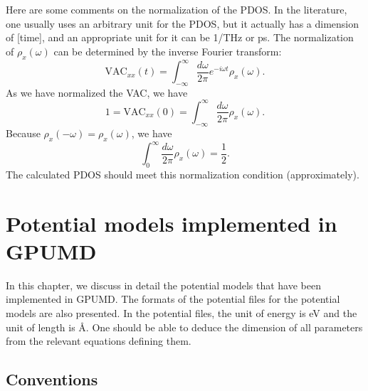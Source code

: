 \documentclass[12pt,a4paper]{report}
\begin{document}
Here are some comments on the normalization of the PDOS. In the literature, one usually uses an arbitrary unit for the PDOS, but it actually has a dimension of [time], and an appropriate unit for it can be 1/THz or ps. The normalization of $\rho_x(\omega)$ can be determined by the inverse Fourier transform:
\begin{equation}
\text{VAC}_{xx}(t)
 = \int_{-\infty}^{\infty} \frac{d\omega}{2\pi} e^{-i\omega t}\rho_x(\omega).
\end{equation}
As we have normalized the VAC, we have
\begin{equation}
1 = \text{VAC}_{xx}(0)
 = \int_{-\infty}^{\infty}
 \frac{d\omega}{2\pi}\rho_x(\omega).
\end{equation}
Because $\rho_x(-\omega)=\rho_x(\omega)$, we have
\begin{equation}
\int_{0}^{\infty}
 \frac{d\omega}{2\pi}\rho_x(\omega) = \frac{1}{2}.
\end{equation}
The calculated PDOS should meet this normalization condition (approximately).





\chapter{Potential models implemented in GPUMD}

In this chapter, we discuss in detail the potential models that have been implemented in GPUMD.
The formats of the potential files for the potential models are also presented. In the potential files, the unit of energy is eV and the unit of length is \AA. One should be able to deduce the dimension of all parameters from the relevant equations defining them.

\section{Conventions}
\end{document}
